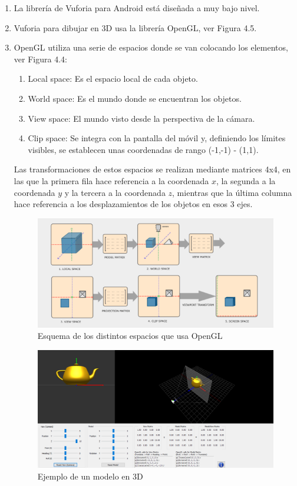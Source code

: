 \begin{enumerate}
    \item La librería de Vuforia para Android está diseñada a muy bajo nivel.
    \item Vuforia para dibujar en 3D usa la librería OpenGL, ver Figura 4.5.
    \item OpenGL utiliza una serie de espacios donde se van colocando los elementos, ver Figura 4.4: 
    \begin{enumerate}
        \item Local space: Es el espacio local de cada objeto.
        \item World space: Es el mundo donde se encuentran los objetos.
        \item View space: El mundo visto desde la perspectiva de la cámara.
        \item Clip space: Se integra con la pantalla del móvil y, definiendo los límites visibles, se establecen unas coordenadas de rango (-1,-1) - (1,1).
    \end{enumerate}
    
        Las transformaciones de estos espacios se realizan mediante matrices 4x4, 
        en las que la primera fila hace referencia a la coordenada $x$, la segunda a la coordenada $y$ y la 
        tercera a la coordenada $z$, mientras que la última columna hace referencia a los desplazamientos 
        de los objetos en esos 3 ejes.
            \begin{figure}[H]
                \centering
                \includegraphics[width=5in]{figures/space-transformation.png}
                \caption{Esquema de los distintos espacios que usa OpenGL}
            \end{figure}

            \begin{figure}[H]
                \centering
                \includegraphics[width=5in]{figures/teapot.png}
                \caption{Ejemplo de un modelo en 3D}
            \end{figure}
    

\end{enumerate}
